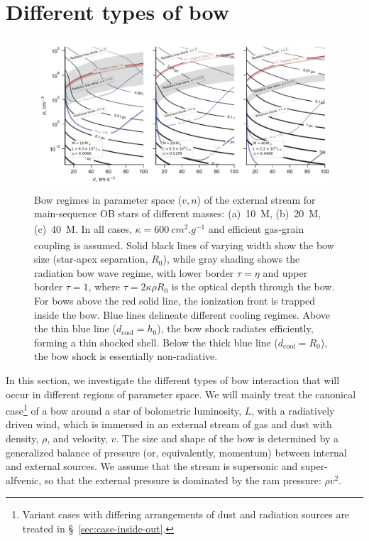 \section{Different types of bow}
\label{sec:different-types-bow}

\begin{figure}
  \includegraphics[width=\linewidth]{figs/zones-v-n-plane}
  \caption{Bow regimes in parameter space (\(v, n\)) of the external
    stream for main-sequence OB stars of different masses:
    (a)~\SI{10}{M_\odot}, (b)~\SI{20}{M_\odot}, (c)~\SI{40}{M_\odot}.  In all
    cases, \(\kappa = \SI{600}{cm^2.g^{-1}}\) and efficient gas-grain
    coupling is assumed. Solid black lines of varying width show the
    bow size (star-apex separation, \(R_0\)), while gray shading shows
    the radiation bow wave regime, with lower border \(\tau = \eta\) and
    upper border \(\tau = 1\), where \(\tau = 2 \kappa \rho R_0\) is the optical
    depth through the bow.  For bows above the red solid line, the
    ionization front is trapped inside the bow.  Blue lines delineate
    different cooling regimes.  Above the thin blue line
    (\(d_{\text{cool}} = h_0\)), the bow shock radiates efficiently,
    forming a thin shocked shell.  Below the thick blue line
    (\(d_{\text{cool}} = R_0\)), the bow shock is essentially
    non-radiative.}
  \label{fig:zones-v-n-plane}
\end{figure}

In this section, we investigate the different types of bow interaction
that will occur in different regions of parameter space. We will
mainly treat the canonical case\footnote{%
  Variant cases with differing arrangements of dust and radiation
  sources are treated in \S~\ref{sec:case-inside-out}.} %
of a bow around a star of bolometric luminosity, \(L\), with a
radiatively driven wind, which is immersed in an external stream of
gas and dust with density, \(\rho\), and velocity, \(v\).  The size and
shape of the bow is determined by a generalized balance of pressure
(or, equivalently, momentum) between internal and external sources.
We assume that the stream is supersonic and super-alfvenic, so that
the external pressure is dominated by the ram pressure: \(\rho v^2\).

